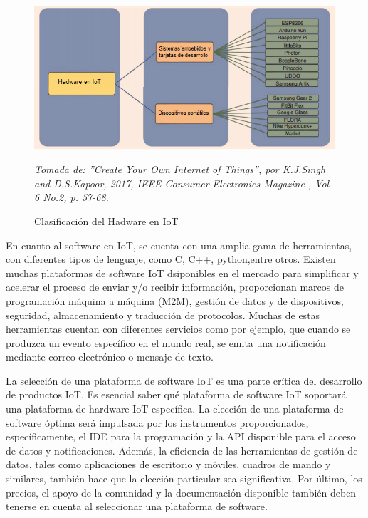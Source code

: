 \begin{figure}[ht!]
\begin{centering}
\includegraphics [trim = 0mm 0mm 0mm 0mm, clip,angle=0,scale=0.6]{Images/hadware}%
\caption{\label{fig:Hadware}Clasificación del Hadware en IoT} \textit{Tomada de: ''Create Your Own Internet of Things'', por K.J.Singh and D.S.Kapoor, 2017, IEEE Consumer Electronics Magazine , Vol 6 No.2, p. 57-68.}
\par\end{centering}
\end{figure}

En cuanto al software en IoT, se cuenta con una amplia gama de herramientas, con diferentes tipos de lenguaje, como C, C++, python,entre otros. Existen muchas plataformas de software IoT dsiponibles en el mercado para simplificar y acelerar el proceso de enviar y/o recibir información, proporcionan marcos de programación máquina a máquina (M2M), gestión de datos y de dispositivos, seguridad, almacenamiento y traducción de protocolos. Muchas de estas herramientas cuentan con diferentes servicios como por ejemplo, que cuando se produzca un evento específico en el mundo real, se emita una notificación mediante correo electrónico o mensaje de texto. 

La selección de una plataforma de software IoT es una parte crítica del desarrollo de productos IoT. Es esencial saber qué plataforma de software IoT soportará una plataforma de hardware IoT específica. La elección de una plataforma de software óptima será impulsada por los instrumentos proporcionados, específicamente, el IDE para la programación y la API disponible para el acceso de datos y notificaciones.
Además, la eficiencia de las herramientas de gestión de datos, tales como aplicaciones de escritorio y móviles, cuadros de mando y similares, también hace que la elección particular sea significativa. Por último, los precios, el apoyo de la comunidad y la documentación disponible también deben tenerse en cuenta al seleccionar una plataforma de software.\cite{7879392}

